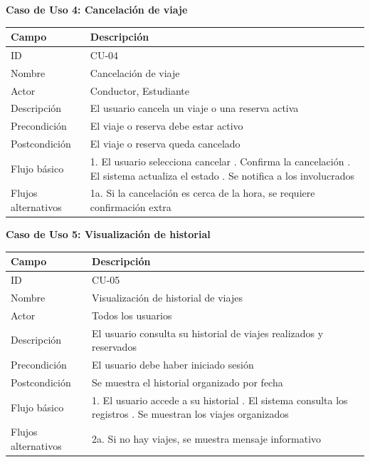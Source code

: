 \documentclass[11pt,a4paper]{article}
\begin{document}
\textbf{Caso de Uso 4: Cancelación de viaje}

\begin{tabularx}{\textwidth}{|l|X|}
\hline
\textbf{Campo} & \textbf{Descripción} \\
\hline
ID & CU-04 \\
\hline
Nombre & Cancelación de viaje \\
\hline
Actor & Conductor, Estudiante \\
\hline
Descripción & El usuario cancela un viaje o una reserva activa \\
\hline
Precondición & El viaje o reserva debe estar activo \\
\hline
Postcondición & El viaje o reserva queda cancelado \\
\hline
Flujo básico & 1. El usuario selecciona cancelar \newline 2. Confirma la cancelación \newline 3. El sistema actualiza el estado \newline 4. Se notifica a los involucrados \\
\hline
Flujos alternativos & 1a. Si la cancelación es cerca de la hora, se requiere confirmación extra \\
\hline
\end{tabularx}

\textbf{Caso de Uso 5: Visualización de historial}

\begin{tabularx}{\textwidth}{|l|X|}
\hline
\textbf{Campo} & \textbf{Descripción} \\
\hline
ID & CU-05 \\
\hline
Nombre & Visualización de historial de viajes \\
\hline
Actor & Todos los usuarios \\
\hline
Descripción & El usuario consulta su historial de viajes realizados y reservados \\
\hline
Precondición & El usuario debe haber iniciado sesión \\
\hline
Postcondición & Se muestra el historial organizado por fecha \\
\hline
Flujo básico & 1. El usuario accede a su historial \newline 2. El sistema consulta los registros \newline 3. Se muestran los viajes organizados \\
\hline
Flujos alternativos & 2a. Si no hay viajes, se muestra mensaje informativo \\
\hline
\end{tabularx}
\end{document}
